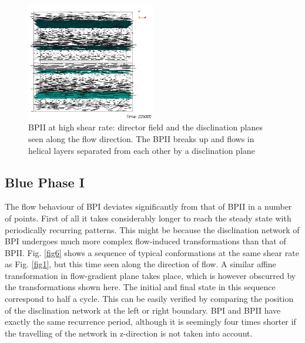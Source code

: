 \documentclass[aps,pre,twocolumn,groupedaddress]{revtex4-1}
\begin{document}
\begin{figure}[h]
\includegraphics[width=0.5\textwidth]{dir-op-y_225k_run949.png}
\caption{BPII at high shear rate: director field and the disclination planes seen along the flow direction. The BPII breaks up and flows in helical layers separated from each other by a disclination plane}
\label{fig5}
\end{figure}

\subsection{Blue Phase I}

The flow behaviour of BPI deviates significantly from that of BPII in a number of points.
First of all it takes considerably longer to reach the steady state with periodically recurring patterns.
This might be because the disclination network of BPI undergoes much more complex flow-induced transformations than that of BPII.
Fig. \ref{fig6} shows a sequence of typical conformations at the same shear rate as Fig. \ref{fig1}, but this time seen along the direction of flow.
A similar affine transformation in flow-gradient plane takes place, which is however obscurred by the transformations shown here. 
The initial and final state in this sequence correspond to half a cycle. 
This can be easily verified by comparing the position of the disclination network at the left or right boundary.
BPI and BPII have exactly the same recurrence period, although it is seemingly four times shorter if the travelling of the network in z-direction is not taken into account.  
\end{document}
